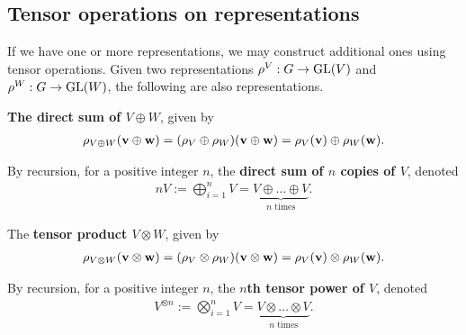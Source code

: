 \subsection{Tensor operations on representations}\label{sect:tensorrepr}

If we have one or more representations, we may construct additional ones using tensor operations. Given two representations $\rho^V: G \rightarrow \text{GL}(V)$ and $\rho^W: G \rightarrow \text{GL}(W)$, the following are also representations.

\textbf{The direct sum of $V \oplus W$}, given by 
\begin{align*}
	\rho_{V \oplus W}(\mathbf{v} \oplus \mathbf{w}) = (\rho_V \oplus \rho_W)(\mathbf{v} \oplus \mathbf{w}) = \rho_V(\mathbf{v}) \oplus \rho_W(\mathbf{w}).
\end{align*}

By recursion, for a positive integer $n$, the \textbf{direct sum of $n$ copies of $V$}, denoted
\begin{align*}
	nV := \bigoplus_{i=1}^n V = \underset{\text{$n$ times}}{\underbrace{V \oplus \dots \oplus V}}.
\end{align*}

The \textbf{tensor product $V \otimes W$}, given by
\begin{align*}
	\rho_{V \otimes W}(\mathbf{v} \otimes \mathbf{w}) = (\rho_V \otimes \rho_W)(\mathbf{v} \otimes \mathbf{w}) = \rho_V(\mathbf{v}) \otimes \rho_W(\mathbf{w}).
\end{align*}

By recursion, for a positive integer $n$, the \textbf{$n$th tensor power of $V$}, denoted
\begin{align*}
	V^{\otimes n} := \bigotimes_{i=1}^n V = \underset{\text{$n$ times}}{\underbrace{V \otimes \dots \otimes V}}.
\end{align*}






	
